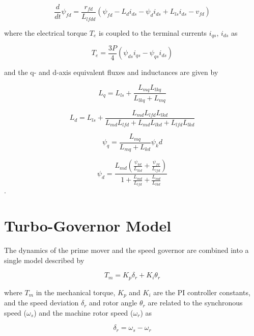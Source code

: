 \begin{equation}
    \frac{d}{dt} \psi_{fd} = \frac{r_{fd}}{L_{lfdd}} \left( \psi_{fd} - L_{d} i_{ds} - \psi_{d} i_{ds}+L_{ls} i_{ds} - v_{fd} \right)
\end{equation}

where the electrical torque $T_e$ is coupled to the terminal currents $i_{qs}$, $i_{ds}$ as

\begin{equation}
    T_e = \frac{3P}{4} \left( \psi_{ds} i_{qs} - \psi_{qs} i_{ds} \right)
\end{equation}

and the q- and d-axis equivalent fluxes and inductances are given by

\begin{equation}
    L_q = L_{ls} + \frac{L_{mq}L_{lkq}}{L_{lkq} + L_{mq}}
\end{equation}

\begin{equation}
    L_d = L_{ls} + \frac{L_{md} L_{lfd} L_{lkd}}{L_{md} L_{lfd} + L_{md} L_{lkd} + L_{lfd} L_{lkd}}
\end{equation}

\begin{equation}
    \psi_q = \frac{L_{mq}}{L_{mq} + L_{kd}} \psi_kd
\end{equation}

\begin{equation}
    \psi_d = \frac{L_{md} \left( \frac{\psi_{kd}}{L_{lkd}} + \frac{\psi_{fd}}{L_{lfd}} \right) }{1 + \frac{L_{md}}{L_{lfd}} + \frac{L_{md}}{L_{lkd}}}
\end{equation}.

\section{Turbo-Governor Model}

The dynamics of the prime mover and the speed governor are combined into a single model described by

\begin{equation}
    T_m = K_p \delta_r + K_i \theta_r
\end{equation}

where $T_m$ in the mechanical torque, $K_p$ and $K_i$ are the PI controller constants, and the speed deviation $\delta_r$ and rotor angle $\theta_r$ are related to the synchronous speed ($\omega_s$) and the machine rotor speed ($\omega_r$) as

\begin{equation}
    \delta_r = \omega_s - \omega_r
\end{equation}

